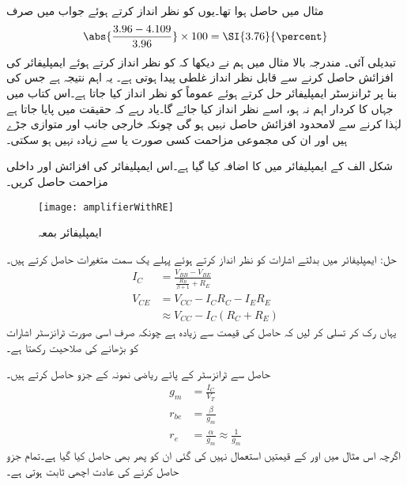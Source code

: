مثال  میں  حاصل ہوا تھا۔یوں  کو نظر انداز کرتے ہوئے جواب میں صرف
\begin{align*}
\abs{\frac{3.96-4.109}{3.96}} \times 100=\SI{3.76}{\percent}
\end{align*} 
تبدیلی آئی۔
مندرجہ بالا مثال میں ہم نے دیکھا کہ  کو نظر انداز کرتے ہوئے ایمپلیفائر کی افزائش حاصل کرنے سے قابل نظر انداز غلطی پیدا ہوتی ہے۔ یہ اہم نتیجہ ہے جس کی بنا پر ٹرانزسٹر ایمپلیفائر حل کرتے ہوئے عموماً  کو نظر انداز کیا جاتا ہے۔اس کتاب میں جہاں  کا کردار اہم نہ ہو، اسے نظر انداز کیا جائے گا۔یاد رہے کہ حقیقت میں  پایا جاتا ہے لہٰذا  کرنے سے لامحدود افزائش حاصل نہیں ہو گی چونکہ خارجی جانب  اور  متوازی جڑے ہیں اور ان کی مجموعی مزاحمت کسی صورت  یا  سے زیادہ نہیں ہو سکتی۔

شکل  الف کے ایمپلیفائر میں   کا اضافہ کیا گیا ہے۔اس ایمپلیفائر کی افزائش  اور داخلی مزاحمت  حاصل کریں۔
\begin{figure}
\centering
\texttt{[image: amplifierWithRE]}
\caption{ایمپلیفائر بمعہ }
\label{شکل_ایمپلیفائر_بمع_مخارجی_مزاحمت}
\end{figure}

حل: ایمپلیفائر میں بدلتے اشارات کو نظر انداز کرتے ہوئے پہلے یک سمت متغیرات حاصل کرتے ہیں۔
\begin{align*}
I_C&=\frac{V_{BB}-V_{BE}}{\frac{R_B}{\beta+1}+R_E}\\
V_{CE}&=V_{CC}-I_C R_C  - I_E R_E\\
&\approx V_{CC}-I_C \left(R_C+R_E \right )
\end{align*}
یہاں رک کر تسلی کر لیں کہ حاصل   کی قیمت  سے زیادہ ہے چونکہ صرف اسی صورت ٹرانزسٹر اشارات کو بڑھانے کی صلاحیت رکھتا ہے۔

حاصل  سے ٹرانزسٹر کے پائے ریاضی نمونہ  کے جزو حاصل کرتے ہیں۔
\begin{align*}
g_m&=\frac{I_C}{V_T}\\
r_{be}&=\frac{\beta}{g_m}\\
r_e&=\frac{\alpha}{g_m} \approx \frac{1}{g_m}
\end{align*}
اگرچہ اس مثال میں  اور   کے قیمتیں استعمال نہیں کی گئی ان کو پھر بھی حاصل کیا گیا ہے۔تمام جزو حاصل کرنے کی عادت اچھی ثابت ہوتی ہے۔

